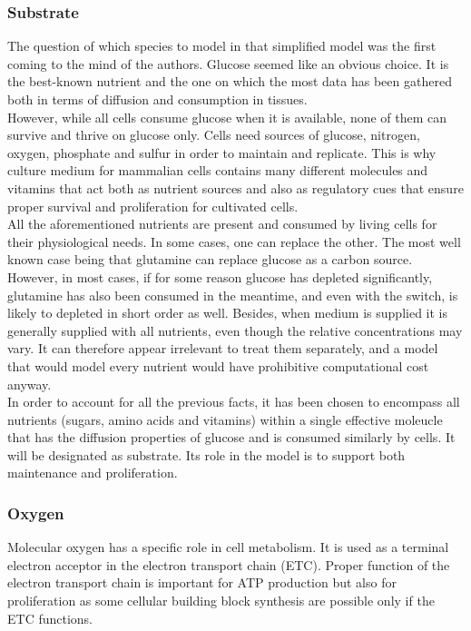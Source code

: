 \documentclass[11pt,a4paper]{article}
\begin{document}
\subsubsection{Substrate}
The question of which species to model in that simplified model was the first coming to the mind of the authors. Glucose seemed like an obvious choice. It is the best-known nutrient and the one on which the most data has been gathered both in terms of diffusion and consumption in tissues.\\

However, while all cells consume glucose when it is available, none of them can survive and thrive on glucose only. Cells need sources of glucose, nitrogen, oxygen, phosphate and sulfur in order to maintain and replicate.\cite{Cooper2006}\cite{Spinelli2021} This is why culture medium for mammalian cells contains many different molecules and vitamins that act both as nutrient sources and also as regulatory cues that ensure proper survival and proliferation for cultivated cells.\\

All the aforementioned nutrients are present and consumed by living cells for their physiological needs. In some cases, one can replace the other. The most well known case being that glutamine can replace glucose as a carbon source.\cite{Stuart2023}\cite{Mazurek1997} However, in most cases, if for some reason glucose has depleted significantly, glutamine has also been consumed in the meantime, and even with the switch, is likely to depleted in short order as well. Besides, when medium is supplied it is generally supplied with all nutrients, even though the relative concentrations may vary. It can therefore appear irrelevant to treat them separately, and a model that would model every nutrient would have prohibitive computational cost anyway.\\

In order to account for all the previous facts, it has been chosen to encompass all nutrients (sugars, amino acids and vitamins) within a single effective moleucle that has the diffusion properties of glucose and is consumed similarly by cells. It will be designated as substrate. Its role in the model is to support both maintenance and proliferation.\\

\subsubsection{Oxygen}
Molecular oxygen has a specific role in cell metabolism. It is used as a terminal electron acceptor in the electron transport chain (ETC). Proper function of the electron transport chain is important for ATP production but also for proliferation as some cellular building block synthesis are possible only if the ETC functions.\cite{Martinez2020}\\
\end{document}
